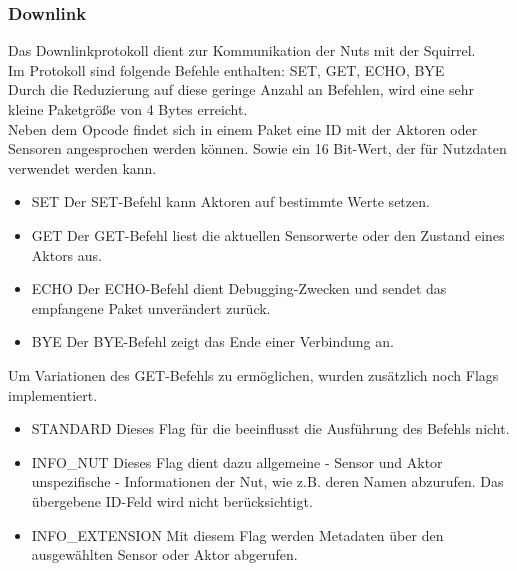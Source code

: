 \documentclass[12pt,a4paper]{article}
\begin{document}
	\subsubsection{Downlink}  
Das Downlinkprotokoll dient zur Kommunikation der Nuts mit der Squirrel.\\
Im Protokoll sind folgende Befehle enthalten: SET, GET, ECHO, BYE\\
Durch die Reduzierung auf diese geringe Anzahl an Befehlen, wird eine sehr kleine Paketgröße von 4 Bytes erreicht.\\
Neben dem Opcode findet sich in einem Paket eine ID mit der Aktoren oder Sensoren angesprochen werden können. Sowie ein 16 Bit-Wert, der für Nutzdaten verwendet werden kann.\\
\begin{itemize}
	\item{SET}
Der SET-Befehl kann Aktoren auf bestimmte Werte setzen.
	\item{GET}
Der GET-Befehl liest die aktuellen Sensorwerte oder den Zustand eines Aktors aus.
	\item{ECHO}
Der ECHO-Befehl dient Debugging-Zwecken und sendet das empfangene Paket unverändert zurück.
	\item{BYE}
Der BYE-Befehl zeigt das Ende einer Verbindung an.
\end{itemize}
Um Variationen des GET-Befehls zu ermöglichen, wurden zusätzlich noch Flags implementiert.\\
\begin{itemize}
	\item{STANDARD}
Dieses Flag für die beeinflusst die Ausführung des Befehls nicht.
	\item{INFO\_NUT}
Dieses Flag dient dazu allgemeine - Sensor und Aktor unspezifische - Informationen der Nut, wie z.B. deren Namen abzurufen. Das übergebene ID-Feld wird nicht berücksichtigt.\\
	\item{INFO\_EXTENSION}
Mit diesem Flag werden Metadaten über den ausgewählten Sensor oder Aktor abgerufen.
\end{itemize}
\end{document}
